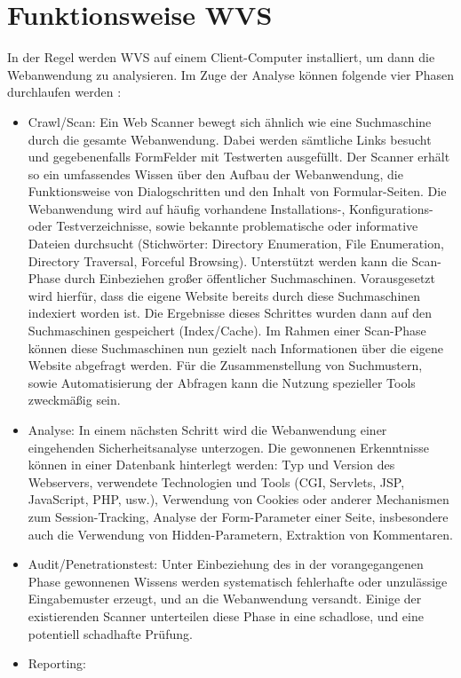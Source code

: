 \documentclass[12pt,oneside,a4paper,parskip]{scrbook}
\begin{document}
  \section{Funktionsweise WVS}
  In der Regel werden WVS auf einem Client-Computer installiert, um dann die Webanwendung zu analysieren. Im Zuge der Analyse können folgende vier Phasen durchlaufen werden \cite{BSI4}:
  \begin{itemize}
    \item Crawl/Scan:
    Ein Web Scanner bewegt sich ähnlich wie eine Suchmaschine durch die gesamte
    Webanwendung. Dabei werden sämtliche Links besucht und gegebenenfalls FormFelder mit Testwerten ausgefüllt. Der Scanner erhält so ein umfassendes Wissen über den Aufbau der Webanwendung, die Funktionsweise von Dialogschritten und den Inhalt von Formular-Seiten.
    Die Webanwendung wird auf häufig vorhandene Installations-, Konfigurations- oder
    Testverzeichnisse, sowie bekannte problematische oder informative Dateien durchsucht (Stichwörter: Directory Enumeration, File Enumeration, Directory Traversal, Forceful Browsing).
    Unterstützt werden kann die Scan-Phase durch Einbeziehen großer öffentlicher
    Suchmaschinen. Vorausgesetzt wird hierfür, dass die eigene Website bereits durch
    diese Suchmaschinen indexiert worden ist. Die Ergebnisse dieses Schrittes wurden
    dann auf den Suchmaschinen gespeichert (Index/Cache). Im Rahmen einer Scan-Phase können diese Suchmaschinen nun gezielt nach Informationen über die eigene Website abgefragt werden. Für die Zusammenstellung von Suchmustern, sowie Automatisierung der Abfragen kann die Nutzung spezieller Tools zweckmäßig sein.
    \item Analyse:
    In einem nächsten Schritt wird die Webanwendung einer eingehenden Sicherheitsanalyse unterzogen. Die gewonnenen Erkenntnisse können in einer Datenbank hinterlegt werden: Typ und Version des Webservers, verwendete Technologien und Tools (CGI, Servlets, JSP, JavaScript, PHP, usw.), Verwendung von Cookies oder
    anderer Mechanismen zum Session-Tracking, Analyse der Form-Parameter einer Seite, insbesondere auch die Verwendung von Hidden-Parametern, Extraktion von Kommentaren.
    \item Audit/Penetrationstest:
    Unter Einbeziehung des in der vorangegangenen Phase gewonnenen Wissens werden
    systematisch fehlerhafte oder unzulässige Eingabemuster erzeugt, und an die Webanwendung versandt. Einige der existierenden Scanner unterteilen diese Phase in eine schadlose, und eine potentiell schadhafte Prüfung.
    \item Reporting:

\end{itemize}
\end{document}
